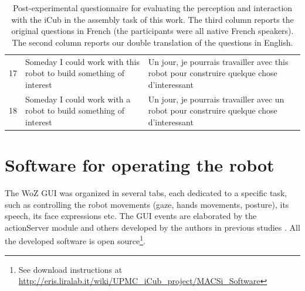 \begin{table}
{\begin{tabular}{|c|p{7.5cm}|p{7.5cm}|}
17 & Someday I could work with this robot to build something of interest& Un jour, je pourrais travailler avec this robot pour construire quelque chose d'interessant\\
18&  Someday I could work with a robot to build something of interest& Un jour, je pourrais travailler avec un robot pour construire quelque chose d'interessant\\
\hline
\end{tabular}}
\caption{Post-experimental questionnaire for evaluating the perception and interaction with the iCub in the assembly task of this work. The third column reports the original questions in French (the participants were all native French speakers). The second column reports our double translation of the questions in English.}
\label{table:postexperimentquestionnaire}
\end{table}


\section{Software for operating the robot}\label{appendix:GUI}

The WoZ GUI was organized in several tabs, each dedicated to a specific task, such as controlling the robot movements (gaze, hands movements, posture), its speech, its face expressions etc.
The GUI events are elaborated by the actionServer module and others developed by the authors in previous studies \cite{ivaldi2014frontiers,Ivaldi2014tamd}. All the developed software is open source\footnote{See download instructions at \url{http://eris.liralab.it/wiki/UPMC_iCub_project/MACSi_Software}}.

